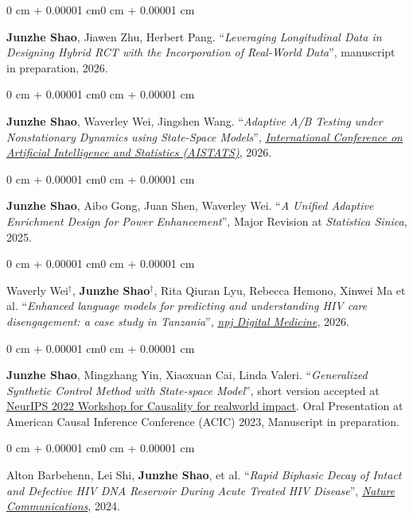 \documentclass[10pt, letterpaper]{article}
\newenvironment{onecolentry}{
    \begin{adjustwidth}{0 cm + 0.00001 cm}{0 cm + 0.00001 cm}
}{\end{adjustwidth}}
\begin{document}
\begin{onecolentry}
    \textbf{Junzhe Shao}, Jiawen Zhu, Herbert Pang. ``\textit{Leveraging Longitudinal Data in Designing Hybrid RCT with the Incorporation of Real-World Data}'', manuscript in preparation, 2026.
\end{onecolentry}
\vspace{0.20 cm}

\begin{onecolentry}
    \textbf{Junzhe Shao}, Waverley Wei, Jingshen Wang. ``\textit{Adaptive A/B Testing under Nonstationary Dynamics using State-Space Models}'',  \href{https://virtual.aistats.org/virtual/2026/poster/10811}{\textit{International Conference on Artificial Intelligence and Statistics (AISTATS)}}, 2026.
\end{onecolentry}
\vspace{0.20 cm}
\begin{onecolentry}
    \textbf{Junzhe Shao}, Aibo Gong, Juan Shen, Waverley Wei. ``\textit{A Unified Adaptive Enrichment Design for Power Enhancement}'', Major Revision at \textit{Statistica Sinica}, 2025.
\end{onecolentry}
\vspace{0.20 cm}

\begin{onecolentry}
    Waverly Wei$^\dagger$, \textbf{Junzhe Shao}$^\dagger$, Rita Qiuran Lyu, Rebecca Hemono, Xinwei Ma et al. ``\textit{Enhanced language models for predicting and understanding HIV care disengagement: a case study in Tanzania}'', \href{https://www.nature.com/articles/s41746-026-02349-3}{\textit{npj Digital Medicine}}, 2026.
\end{onecolentry}
\vspace{0.20 cm}
\begin{onecolentry}
\textbf{Junzhe Shao}, Mingzhang Yin, Xiaoxuan Cai, Linda Valeri. ``\textit{Generalized Synthetic Control Method with State-space Model}'', short version accepted at \href{https://openreview.net/pdf?id=OwyiIBIFCrn}{NeurIPS 2022 Workshop for Causality for realworld impact}. Oral Presentation at American Causal Inference Conference (ACIC) 2023, Manuscript in preparation.
\end{onecolentry}

\vspace{0.20 cm}
\begin{onecolentry}
Alton Barbehenn, Lei Shi, \textbf{Junzhe Shao}, et al. ``\textit{Rapid Biphasic Decay of Intact and Defective HIV DNA Reservoir During Acute Treated HIV Disease}'', \href{https://www.nature.com/articles/s41467-024-54116-1}{\textit{Nature Communications}}, 2024.
\end{onecolentry}
\vspace{0.20 cm}
\end{document}
